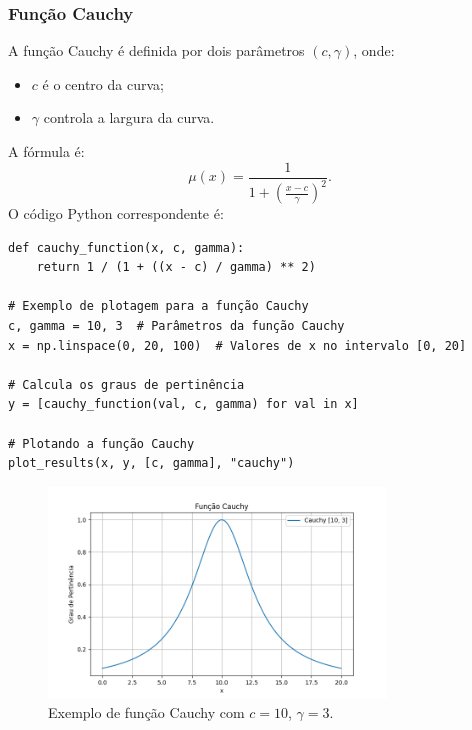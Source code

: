 \documentclass[a4paper,12pt]{article}
\begin{document}
\subsubsection{Função Cauchy}
A função Cauchy é definida por dois parâmetros $(c, \gamma)$, onde:
\begin{itemize}
    \item $c$ é o centro da curva;
    \item $\gamma$ controla a largura da curva.
\end{itemize}
A fórmula é:
\[
\mu(x) = \frac{1}{1 + \left(\frac{x - c}{\gamma}\right)^2}.
\]
O código Python correspondente é:
\begin{verbatim}
def cauchy_function(x, c, gamma):
    return 1 / (1 + ((x - c) / gamma) ** 2)

# Exemplo de plotagem para a função Cauchy
c, gamma = 10, 3  # Parâmetros da função Cauchy
x = np.linspace(0, 20, 100)  # Valores de x no intervalo [0, 20]

# Calcula os graus de pertinência
y = [cauchy_function(val, c, gamma) for val in x]

# Plotando a função Cauchy
plot_results(x, y, [c, gamma], "cauchy")

\end{verbatim}
\begin{figure}[H]
    \centering
    \includegraphics[width=0.8\textwidth]{img/cauchy.png}
    \caption{Exemplo de função Cauchy com $c=10$, $\gamma=3$.}
\end{figure}
\end{document}
